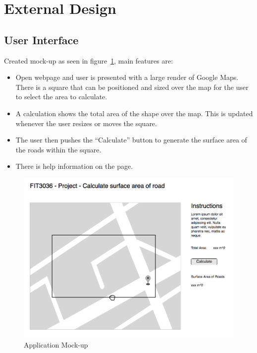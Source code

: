 \documentclass[a4paper,11pt]{article}
\begin{document}
\section{External Design}



\subsection{User Interface}

Created mock-up as seen in figure~\ref{fig:mockup}, main features are:

\begin{itemize}
  \item Open webpage and user is presented with a large render of Google Maps.
    There is a square that can be positioned and sized over the map for the user
    to select the area to calculate.
  \item A calculation shows the total area of the shape over the map. This is
    updated whenever the user resizes or moves the square.
  \item The user then pushes the ``Calculate'' button to generate the surface
    area of the roads within the square.
  \item There is help information on the page.
\end{itemize}

\begin{figure}[H]
  \includegraphics[width=\textwidth]{UI-mockup}
  \caption{Application Mock-up}\label{fig:mockup}
\end{figure}
\end{document}
